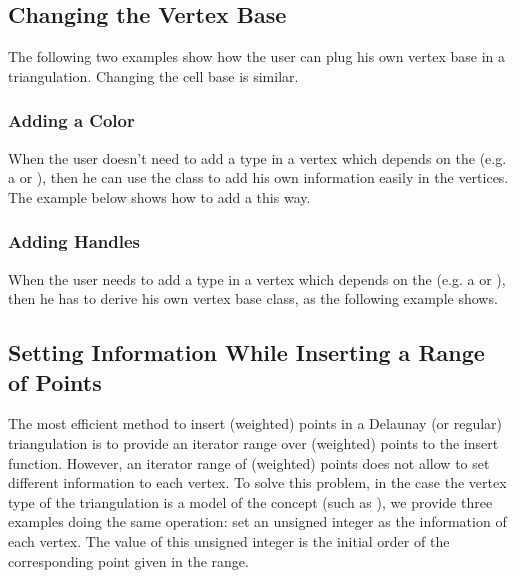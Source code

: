 \subsection{Changing the Vertex Base}
The following two examples show how the user can plug his own vertex base in a
triangulation.  Changing the cell base is similar.

\subsubsection{Adding a Color\label{Triangulation3-sec-examples-color}}
When the user doesn't need to add a type in a vertex which depends on the
 (e.g. a  or
), then he can use the
 class to add his own information
easily in the vertices.  The example below shows how to add a 
this way.


\subsubsection{Adding Handles}
When the user needs to add a type in a vertex which depends on the
 (e.g. a  or
), then he has to derive his own vertex base class,
as the following example shows.


\subsection{Setting Information While Inserting a Range of Points}
The most efficient method to insert (weighted) points in a
Delaunay (or regular) triangulation is to provide an iterator
range over (weighted) points to the insert function. However, an iterator range of
(weighted) points does not allow to set different information to each vertex.
To solve this problem, in the case the vertex type  of the triangulation 
is a model of the concept 
(such as ), we provide three examples 
doing the same operation: set an unsigned integer as the information 
of each vertex. The value of this unsigned integer is the initial order
of the corresponding point given in the range.

